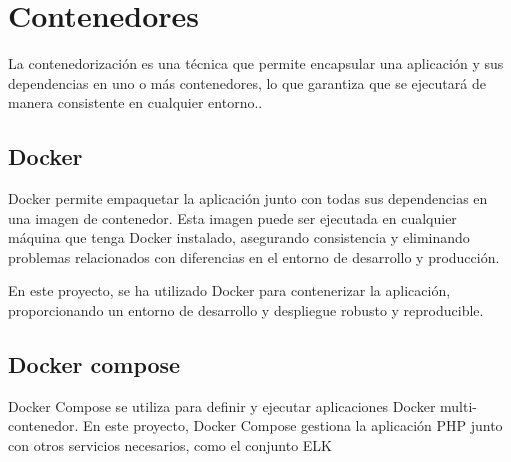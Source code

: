\section*{Contenedores}
La contenedorización es una técnica que permite encapsular una aplicación y sus dependencias en uno o más contenedores,
lo que garantiza que se ejecutará de manera consistente en cualquier entorno..

\subsection*{Docker}
Docker permite empaquetar la aplicación junto con todas sus dependencias en una imagen de contenedor. Esta imagen puede
ser ejecutada en cualquier máquina que tenga Docker instalado, asegurando consistencia y eliminando problemas
relacionados con diferencias en el entorno de desarrollo y producción.

En este proyecto, se ha utilizado Docker para contenerizar la aplicación, proporcionando un entorno de desarrollo y
despliegue robusto y reproducible.

\subsection*{Docker compose}
Docker Compose se utiliza para definir y ejecutar aplicaciones Docker multi-contenedor. En este proyecto, Docker Compose
gestiona la aplicación PHP junto con otros servicios necesarios, como el conjunto ELK
